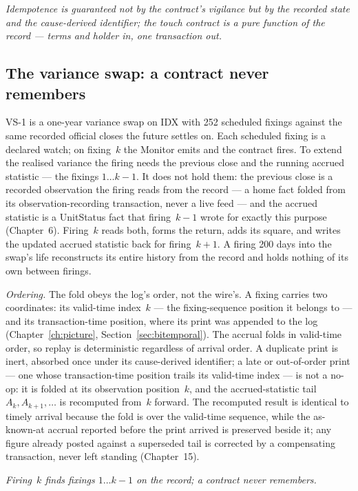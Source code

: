 \emph{Idempotence is guaranteed not by the contract's vigilance but by the
recorded state and the cause-derived identifier; the touch contract is a pure
function of the record --- terms and holder in, one transaction out.}

\subsection{The variance swap: a contract never remembers}

VS-1 is a one-year variance swap on IDX with 252 scheduled fixings against the
same recorded official closes the future settles on. Each scheduled fixing is a
declared watch; on fixing~$k$ the Monitor emits and the contract fires. To
extend the realised variance the firing needs the previous close and the running
accrued statistic --- the fixings $1 \ldots k-1$. It does not hold them: the
previous close is a recorded observation the firing reads from the record --- a
home fact folded from its observation-recording transaction, never a live feed ---
and the accrued statistic is a UnitStatus fact that firing~$k-1$ wrote for exactly
this purpose (Chapter~6).
Firing~$k$ reads both, forms the return, adds its square, and writes the updated
accrued statistic back for firing~$k+1$. A firing 200 days into the swap's life
reconstructs its entire history from the record and holds nothing of its own
between firings.

\emph{Ordering.} The fold obeys the log's order, not the wire's. A fixing carries
two coordinates: its valid-time index~$k$ --- the fixing-sequence position it
belongs to --- and its transaction-time position, where its print was appended to
the log (Chapter~\ref{ch:picture}, Section~\ref{sec:bitemporal}). The accrual folds
in valid-time order, so replay is deterministic regardless of arrival order. A
duplicate print is inert, absorbed once under its cause-derived identifier; a late
or out-of-order print --- one whose transaction-time position trails its valid-time
index --- is not a no-op: it is folded at its observation position~$k$, and the
accrued-statistic tail $A_k, A_{k+1}, \ldots$ is recomputed from~$k$ forward. The
recomputed result is identical to timely arrival because the fold is over the
valid-time sequence, while the as-known-at accrual reported before the print
arrived is preserved beside it; any figure already posted against a superseded tail
is corrected by a compensating transaction, never left standing (Chapter~15).

\emph{Firing~$k$ finds fixings $1 \ldots k-1$ on the record; a contract never
remembers.}

